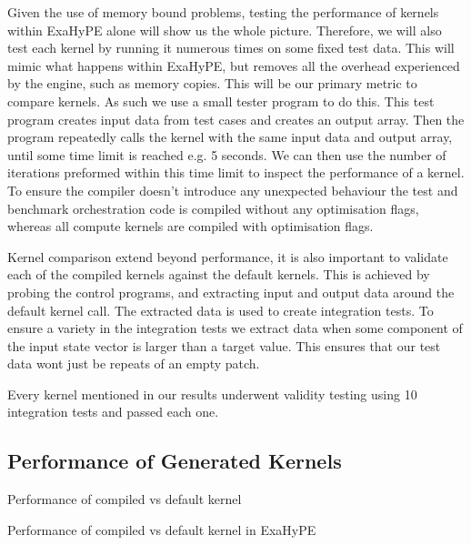 Given the use of memory bound problems, testing the performance of kernels within ExaHyPE alone will show us the whole picture.
Therefore, we will also test each kernel by running it numerous times on some fixed test data.
This will mimic what happens within ExaHyPE, but removes all the overhead experienced by the engine, such as memory copies.
This will be our primary metric to compare kernels.
As such we use a small tester program to do this.
This test program creates input data from test cases and creates an output array.
Then the program repeatedly calls the kernel with the same input data and output array, until some time limit is reached e.g. 5 seconds.
We can then use the number of iterations preformed within this time limit to inspect the performance of a kernel.
To ensure the compiler doesn't introduce any unexpected behaviour the test and benchmark orchestration code is compiled without any optimisation flags, whereas all compute kernels are compiled with optimisation flags.

Kernel comparison extend beyond performance, it is also important to validate each of the compiled kernels against the default kernels.
This is achieved by probing the control programs, and extracting input and output data around the default kernel call.
The extracted data is used to create integration tests.
To ensure a variety in the integration tests we extract data when some component of the input state vector is larger than a target value. 
This ensures that our test data wont just be repeats of an empty patch.

Every kernel mentioned in our results underwent validity testing using 10 integration tests and passed each one.

\subsection{Performance of Generated Kernels}

\begin{table}
    \centering
 
\caption{Performance of compiled vs default kernel}\label{tab:kernel_comapre} 
\end{table}

\begin{table}
    \centering
 
\caption{Performance of compiled vs default kernel in ExaHyPE}\label{tab:exahype} 
\end{table}

